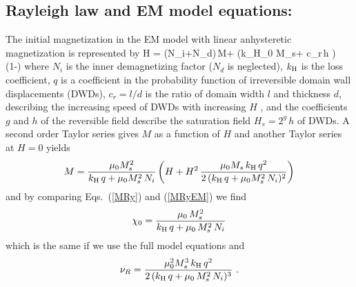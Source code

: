 \documentclass[../main.tex]{subfiles}
\begin{document}
\subsection{Rayleigh law and EM model equations:}

The initial magnetization in the EM model with linear anhysteretic magnetization is represented by \cite{JAP75}
\be
H = (N_i+N_d)\,M+
    \left({k_{\rm H}\over \mu_0 M_s}+
    c_r\,h \right)
    \left(1-\exp{}\right)
  \label{H}
\ee
where $N_i$ is the inner demagnetizing factor ($N_d$ is neglected), $k_{\rm H}$ is the loss coefficient, $q$ is a coefficient in the probability function of irreversible domain wall displacements (DWDs), $c_r=l/d$ is the ratio of domain width $l$ and thickness $d$, describing the increasing speed of DWDs with increasing $H$ \cite{JAP96}, and the coefficients $g$ and $h$ of the reversible field describe the saturation field $H_s=2^g\,h$ of DWDs. A second order Taylor series gives $M$ as a function of $H$ and another Taylor series at $H=0$ yields
\begin{equation}
  M = {\mu_0 M_s^2\over k_{\rm H}\,q + \mu_0 M_s^2\,N_i}
\left(H + H^2\,{\mu_0 M_s\,k_{\rm H}\,q^2\over 2\,(k_{\rm H}\,q+\mu_0 M_s^2\,N_i)^2} \right)
  \label{MRyEM}
\end{equation}
and by comparing Eqs.~(\ref{MRy}) and (\ref{MRyEM}) we find
\begin{equation}
  \chi_0 = {\mu_0\,M_s^2\over k_{\rm H}\,q + \mu_0\,M_s^2\,N_i}
    \label{xEM}
\end{equation}
which is the same if we use the full model equations \cite{JAP96} and
\begin{equation}
  \nu_R = {\mu_0^2 M_s^3\,k_{\rm H}\,q^2\over 2\,(k_{\rm H}\,q+\mu_0\,M_s^2\,N_i)^3} \ .
\end{equation}

\cleardoublepage
\end{document}
